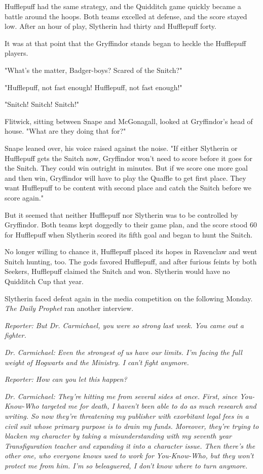 Hufflepuff had the same strategy, and the Quidditch game quickly became a battle around the hoops. Both teams excelled at defense, and the score stayed low. After an hour of play, Slytherin had thirty and Hufflepuff forty.

It was at that point that the Gryffindor stands began to heckle the Hufflepuff players.

"What's the matter, Badger-boys? Scared of the Snitch?"

"Hufflepuff, not fast enough! Hufflepuff, not fast enough!"

"Snitch! Snitch! Snitch!"

Flitwick, sitting between Snape and McGonagall, looked at Gryffindor's head of house. "What are they doing that for?"

Snape leaned over, his voice raised against the noise. "If either Slytherin or Hufflepuff gets the Snitch now, Gryffindor won't need to score before it goes for the Snitch. They could win outright in minutes. But if we score one more goal and then win, Gryffindor will have to play the Quaffle to get first place. They want Hufflepuff to be content with second place and catch the Snitch before we score again."

But it seemed that neither Hufflepuff nor Slytherin was to be controlled by Gryffindor. Both teams kept doggedly to their game plan, and the score stood 60 for Hufflepuff when Slytherin scored its fifth goal and began to hunt the Snitch.

No longer willing to chance it, Hufflepuff placed its hopes in Ravenclaw and went Snitch hunting, too. The gods favored Hufflepuff, and after furious feints by both Seekers, Hufflepuff claimed the Snitch and won. Slytherin would have no Quidditch Cup that year.

Slytherin faced defeat again in the media competition on the following Monday. \emph{The Daily Prophet} ran another interview.

\emph{Reporter: But Dr. Carmichael, you were so strong last week. You came out a fighter.}

\emph{Dr. Carmichael: Even the strongest of us have our limits. I'm facing the full weight of Hogwarts and the Ministry. I can't fight anymore.}

\emph{Reporter: How can you let this happen?}

\emph{Dr. Carmichael: They're hitting me from several sides at once. First, since You-Know-Who targeted me for death, I haven't been able to do as much research and writing. So now they're threatening my publisher with exorbitant legal fees in a civil suit whose primary purpose is to drain my funds. Moreover, they're trying to blacken my character by taking a misunderstanding with my seventh year Transfiguration teacher and expanding it into a character issue. Then there's the other one, who everyone knows used to work for You-Know-Who, but they won't protect me from him. I'm so beleaguered, I don't know where to turn anymore.}

